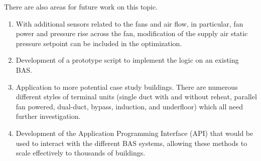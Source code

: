 There are also areas for future work on this topic.

\begin{enumerate}
    \item With additional sensors related to the fans and air flow, in
        particular, fan power and pressure rise across the fan,
        modification of the supply air static pressure setpoint can be
        included in the optimization.
    \item Development of a prototype script to implement the logic on an
        existing BAS.
    \item Application to more potential case study buildings. There are
        numerous different styles of terminal units (single duct with
        and without reheat, parallel fan powered, dual-duct, bypass,
        induction, and underfloor) which all need
        further investigation. 
    \item Development of the Application Programming Interface (API)
        that would be used to interact with the different BAS systems, allowing
        these methods to scale effectively to thousands of buildings. 
\end{enumerate}

